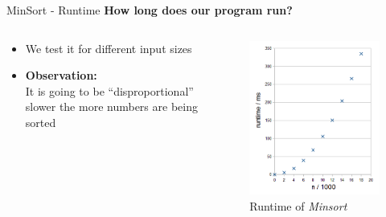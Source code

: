 
\begin{frame}{MinSort - Runtime}
  \textbf{How long does our program run?}
  \vspace{-0.5em}
  \begin{columns}
    \begin{column}[t]{0.5\textwidth}
      \begin{itemize}
        \item
          We test it for different input sizes
        \item
          \textbf{Observation:}\\
          It is going to be \enquote{disproportional}
          slower the more numbers are being sorted
      \end{itemize}
    \end{column}
    \begin{column}[t]{0.45\textwidth}
      \begin{center}%
        \begin{figure}[!h]%
          \includegraphics[width=\textwidth]{Images/MinSort/Minsort.png}%
          \vspace*{-1.0em}\caption{Runtime of \textit{Minsort}}%
          \label{fig:minsort_runtime}%
        \end{figure}%
      \end{center}
    \end{column}
  \end{columns}
\end{frame}

